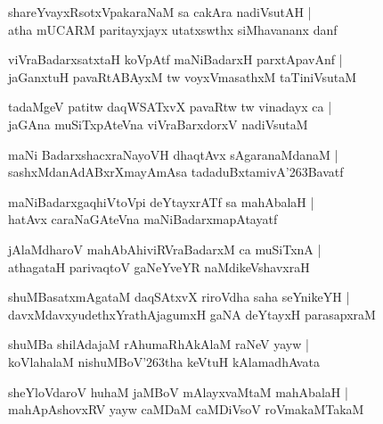 \documentclass[twoside,12pt,openright]{book}
\def\S{\char'263}
\newcounter{shloka}[chapter]
\begin{document}
\begin{shloka}%
shareYvayxRsotxVpakaraNaM sa cakAra nadiVsutAH |\\
atha mUCARM paritayxjayx utatxswthx siMhavananx danf 
\end{shloka}

\begin{shloka}%
viVraBadarxsatxtaH koVpAtf maNiBadarxH parxtApavAnf |\\
jaGanxtuH pavaRtABAyxM tw voyxVmasathxM taTiniVsutaM 
\end{shloka}

\begin{shloka}%
tadaMgeV patitw daqWSATxvX pavaRtw tw vinadayx ca |\\
jaGAna muSiTxpAteVna viVraBarxdorxV nadiVsutaM 
\end{shloka}

\begin{shloka}%
maNi BadarxshacxraNayoVH dhaqtAvx sAgaranaMdanaM |\\
sashxMdanAdABxrXmayAmAsa tadaduBxtamivA\S Bavatf
\end{shloka}

\begin{shloka}%
maNiBadarxgaqhiVtoVpi deYtayxrATf sa mahAbalaH |\\
hatAvx caraNaGAteVna maNiBadarxmapAtayatf
\end{shloka}

\begin{shloka}%
jAlaMdharoV mahAbAhiviRVraBadarxM ca muSiTxnA |\\
athagataH parivaqtoV gaNeYveYR naMdikeVshavxraH
\end{shloka}

\begin{shloka}%
shuMBasatxmAgataM daqSAtxvX riroVdha saha seYnikeYH |\\
davxMdavxyudethxYrathAjagumxH gaNA deYtayxH parasapxraM 
\end{shloka}

\begin{shloka}%
shuMBa shilAdajaM rAhumaRhAkAlaM raNeV yayw |\\
koVlahalaM nishuMBoV\S tha keVtuH kAlamadhAvata
\end{shloka}

\begin{shloka}%
sheYloVdaroV huhaM jaMBoV mAlayxvaMtaM mahAbalaH |\\
mahApAshovxRV yayw caMDaM caMDiVsoV roVmakaMTakaM
\end{shloka}
\end{document}
